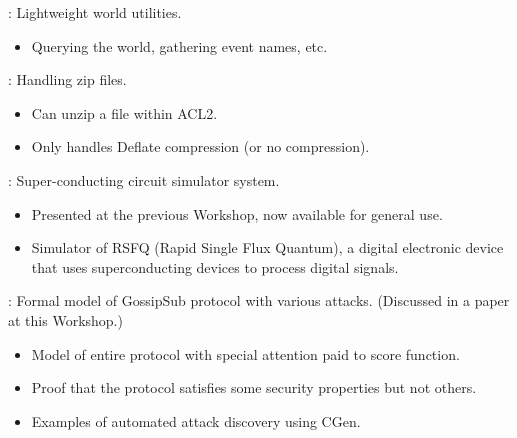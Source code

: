 
\begin{frame}

\newlibtitle

:
Lightweight world utilities.
\begin{itemize}
\item Querying the world, gathering event names, etc.
\end{itemize}

\end{frame}


\begin{frame}

\newlibtitle

:
Handling zip files.
\begin{itemize}
\item Can unzip a file within ACL2.
\item Only handles Deflate compression (or no compression).
\end{itemize}

\end{frame}


\begin{frame}

\newlibtitle

:
Super-conducting circuit simulator system.
\begin{itemize}
\item Presented at the previous Workshop, now available for general use.
\item Simulator of RSFQ (Rapid Single Flux Quantum),
      a digital electronic device that uses superconducting devices
      to process digital signals.
\end{itemize}

\end{frame}


\begin{frame}

\newlibtitle

:
Formal model of GossipSub protocol with various attacks.
(Discussed in a paper at this Workshop.)
\begin{itemize}
\item Model of entire protocol with special attention paid to score function.
\item Proof that the protocol satisfies some security properties but not others.
\item Examples of automated attack discovery using CGen.
\end{itemize}

\end{frame}

